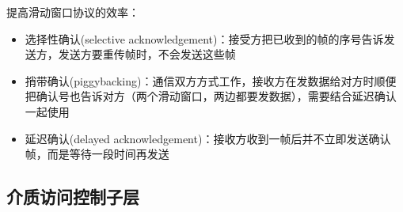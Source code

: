 \myhline
提高滑动窗口协议的效率：
\begin{itemize}
	\item 选择性确认(selective acknowledgement)：接受方把已收到的帧的序号告诉发送方，发送方要重传帧时，不会发送这些帧
	\item 捎带确认(piggybacking)：通信双方方式工作，接收方在发数据给对方时顺便把确认号也告诉对方（两个滑动窗口，两边都要发数据），需要结合延迟确认一起使用
	\item 延迟确认(delayed acknowledgement)：接收方收到一帧后并不立即发送确认帧，而是等待一段时间再发送
\end{itemize}

\subsection{介质访问控制子层}
